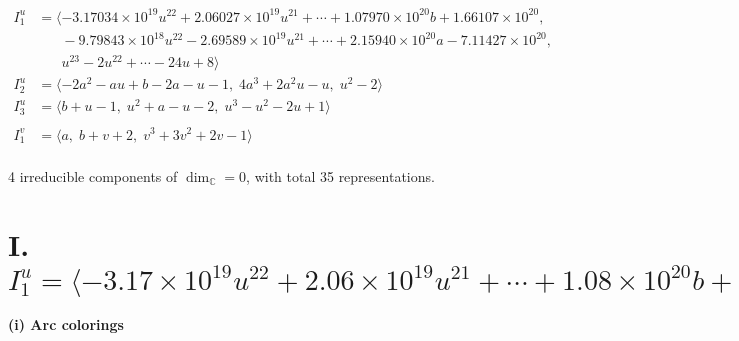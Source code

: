 \documentclass[1p]{elsarticle_modified}
\theoremstyle{definition}
\begin{document}
\begin{align*}
I^u_{1}&=\langle 
-3.17034\times10^{19} u^{22}+2.06027\times10^{19} u^{21}+\cdots+1.07970\times10^{20} b+1.66107\times10^{20},\\
\phantom{I^u_{1}}&\phantom{= \langle  }-9.79843\times10^{18} u^{22}-2.69589\times10^{19} u^{21}+\cdots+2.15940\times10^{20} a-7.11427\times10^{20},\\
\phantom{I^u_{1}}&\phantom{= \langle  }u^{23}-2 u^{22}+\cdots-24 u+8\rangle \\
I^u_{2}&=\langle 
-2 a^2- a u+b-2 a- u-1,\;4 a^3+2 a^2 u- u,\;u^2-2\rangle \\
I^u_{3}&=\langle 
b+u-1,\;u^2+a- u-2,\;u^3- u^2-2 u+1\rangle \\
\\
I^v_{1}&=\langle 
a,\;b+v+2,\;v^3+3 v^2+2 v-1\rangle \\
\end{align*}
\raggedright * 4 irreducible components of $\dim_{\mathbb{C}}=0$, with total 35 representations.\\
\newpage
\renewcommand{\arraystretch}{1}
\centering \section*{I. $I^u_{1}= \langle -3.17\times10^{19} u^{22}+2.06\times10^{19} u^{21}+\cdots+1.08\times10^{20} b+1.66\times10^{20},\;-9.80\times10^{18} u^{22}-2.70\times10^{19} u^{21}+\cdots+2.16\times10^{20} a-7.11\times10^{20},\;u^{23}-2 u^{22}+\cdots-24 u+8 \rangle$}
\flushleft \textbf{(i) Arc colorings}\\
\end{document}
